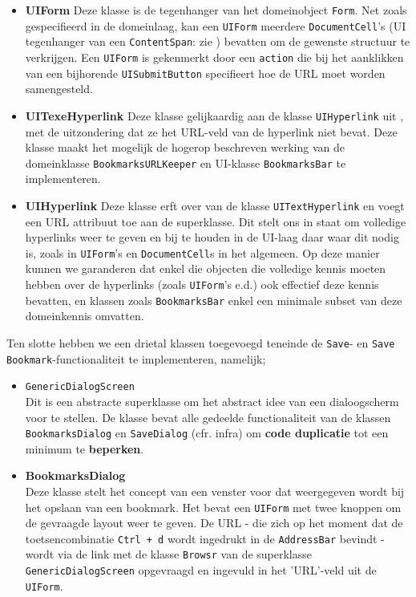 \documentclass[12pt]{article}
\begin{document}
\begin{itemize}
\begin{itemize}
		\item \textbf{UIForm}
		Deze klasse is de tegenhanger van het domeinobject \texttt{Form}. Net zoals gespecifieerd in de domeinlaag, kan een \texttt{UIForm} meerdere \texttt{DocumentCell}'s (UI tegenhanger van een \texttt{ContentSpan}: zie ) bevatten om de gewenste structuur te verkrijgen. Een \texttt{UIForm} is gekenmerkt door een \texttt{action} die bij het aanklikken van een bijhorende \texttt{UISubmitButton} specifieert hoe de URL moet worden samengesteld.
		
		\item \textbf{UITexeHyperlink} 
		Deze klasse gelijkaardig aan de klasse \texttt{UIHyperlink} uit , met de uitzondering dat ze het URL-veld van de hyperlink niet bevat. Deze klasse maakt het mogelijk de hogerop beschreven werking van de domeinklasse \texttt{BookmarksURLKeeper} en UI-klasse \texttt{BookmarksBar} te implementeren. 
		
		\item \textbf{UIHyperlink}
		Deze klasse erft over van de klasse \texttt{UITextHyperlink} en voegt een URL attribuut toe aan de superklasse. Dit stelt ons in staat om volledige hyperlinks weer te geven en bij te houden in de UI-laag daar waar dit nodig is, zoals in \texttt{UIForm}'s en \texttt{DocumentCell}s in het algemeen. Op deze manier kunnen we garanderen dat enkel die objecten die volledige kennis moeten hebben over de hyperlinks (zoals \texttt{UIForm}'s e.d.) ook effectief deze kennis bevatten, en klassen zoals \texttt{BookmarksBar} enkel een minimale subset van deze domeinkennis omvatten.
	\end{itemize}

	Ten slotte hebben we een drietal klassen toegevoegd teneinde de \texttt{Save}- en \texttt{Save Bookmark}-functionaliteit te implementeren, namelijk;
	\begin{itemize}
		\item \texttt{GenericDialogScreen}\\
		Dit is een abstracte superklasse om het abstract idee van een dialoogscherm voor te stellen. De klasse bevat alle gedeelde functionaliteit van de klassen \texttt{BookmarksDialog} en \texttt{SaveDialog} (cfr. infra) om \textbf{code duplicatie} tot een minimum te \textbf{beperken}.
		
		\item \textbf{BookmarksDialog}\\
		Deze klasse stelt het concept van een venster voor dat weergegeven wordt bij het opslaan van een bookmark. Het bevat een \texttt{UIForm} met twee knoppen om de gevraagde layout weer te geven. De URL - die zich op het moment dat de toetsencombinatie \texttt{Ctrl + d} wordt ingedrukt in de \texttt{AddressBar} bevindt - wordt via de link met de klasse \texttt{Browsr} van de superklasse \texttt{GenericDialogScreen} opgevraagd en ingevuld in het 'URL'-veld uit de \texttt{UIForm}. 
		

\end{itemize}
\end{itemize}
\end{document}
